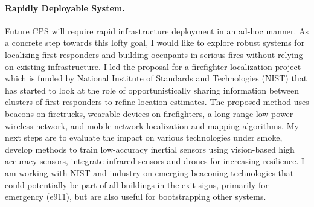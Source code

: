 \documentclass[10pt]{article}
\begin{document}
\paragraph{Rapidly Deployable System. }
Future CPS will require rapid infrastructure deployment in an ad-hoc manner.  As a concrete step towards this lofty goal, I would like to explore robust systems for localizing first responders and building occupants in serious fires without relying on existing infrastructure. I led the proposal for a firefighter localization project which is funded by National Institute of Standards and Technologies (NIST) that has started to look at the role of opportunistically sharing information between clusters of first responders to refine location estimates.
The proposed method uses beacons on firetrucks, wearable devices on firefighters, a long-range low-power wireless network, and mobile network localization and mapping algorithms. 
My next steps are to evaluate the impact on various technologies under smoke, develop methods to train low-accuracy inertial sensors using vision-based high accuracy sensors, integrate infrared sensors and drones for increasing resilience. I am working with NIST and industry on emerging beaconing technologies that could potentially be part of all buildings in the exit signs, primarily for emergency (e911), but are also useful for bootstrapping other systems. 
 
\end{document}
